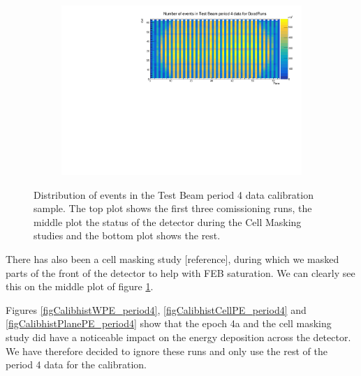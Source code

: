\documentclass[12pt,a4paper]{article}
\begin{document}
\begin{figure}[!hbtp]
\begin{subfigure}[b]{\textwidth}
\end{subfigure}
\begin{subfigure}[b]{\textwidth}
\centering
\includegraphics[width=.9\textwidth]{Plots/Attenprofs_P4Data_CellPlane_GoodRuns.pdf}
\end{subfigure}
\caption{Distribution of events in the Test Beam period 4 data calibration sample. The top plot shows the first three comissioning runs, the middle plot the status of the detector during the Cell Masking studies and the bottom plot shows the rest.}
\label{figCalibhist_period4}
\end{figure}

There has also been a cell masking study [reference], during which we masked parts of the front of the detector to help with FEB saturation. We can clearly see this on the middle plot of figure \ref{figCalibhist_period4}.

Figures \ref{figCalibhistWPE_period4}, \ref{figCalibhistCellPE_period4} and \ref{figCalibhistPlanePE_period4} show that the epoch 4a and the cell masking study did have a noticeable impact on the energy deposition across the detector. We have therefore decided to ignore these runs and only use the rest of the period 4 data for the calibration.
\end{document}
